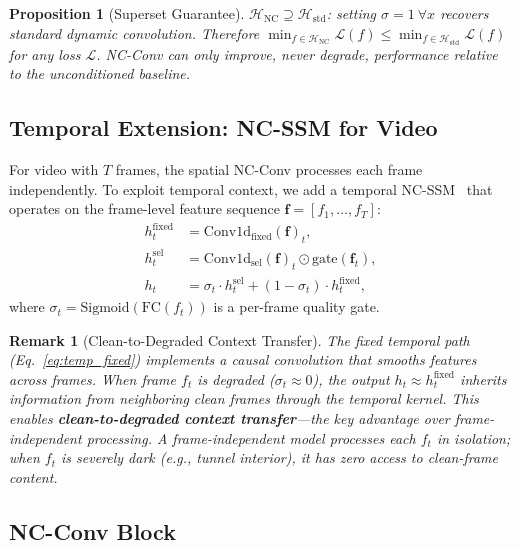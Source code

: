 \documentclass[10pt,twocolumn,letterpaper]{article}
\newtheorem{proposition}{Proposition}
\newtheorem{remark}{Remark}
\begin{document}
\begin{proposition}[Superset Guarantee]
\label{prop:superset}
$\mathcal{H}_{\text{NC}} \supseteq \mathcal{H}_{\text{std}}$: setting $\sigma{=}1\ \forall x$ recovers standard dynamic convolution.
Therefore $\min_{f \in \mathcal{H}_{\text{NC}}} \mathcal{L}(f) \leq \min_{f \in \mathcal{H}_{\text{std}}} \mathcal{L}(f)$ for any loss $\mathcal{L}$.
NC-Conv can only improve, never degrade, performance relative to the unconditioned baseline.
\end{proposition}

\subsection{Temporal Extension: NC-SSM for Video}
\label{sec:temporal_theory}

For video with $T$ frames, the spatial NC-Conv processes each frame independently.
To exploit temporal context, we add a temporal NC-SSM~\cite{choi2026ncssm} that operates on the frame-level feature sequence $\mathbf{f} = [f_1, \ldots, f_T]$:
\begin{align}
h_t^{\text{fixed}} &= \text{Conv1d}_{\text{fixed}}(\mathbf{f})_t, \label{eq:temp_fixed} \\
h_t^{\text{sel}} &= \text{Conv1d}_{\text{sel}}(\mathbf{f})_t \odot \text{gate}(\mathbf{f}_t), \label{eq:temp_sel} \\
h_t &= \sigma_t \cdot h_t^{\text{sel}} + (1 - \sigma_t) \cdot h_t^{\text{fixed}}, \label{eq:temp_blend}
\end{align}
where $\sigma_t = \text{Sigmoid}(\text{FC}(f_t))$ is a per-frame quality gate.

\begin{remark}[Clean-to-Degraded Context Transfer]
\label{rem:transfer}
The fixed temporal path (Eq.~\ref{eq:temp_fixed}) implements a causal convolution that smooths features across frames.
When frame $f_t$ is degraded ($\sigma_t \approx 0$), the output $h_t \approx h_t^{\text{fixed}}$ inherits information from neighboring clean frames through the temporal kernel.
This enables \textbf{clean-to-degraded context transfer}---the key advantage over frame-independent processing.
A frame-independent model processes each $f_t$ in isolation; when $f_t$ is severely dark (e.g., tunnel interior), it has zero access to clean-frame content.
\end{remark}

\subsection{NC-Conv Block}
\end{document}
